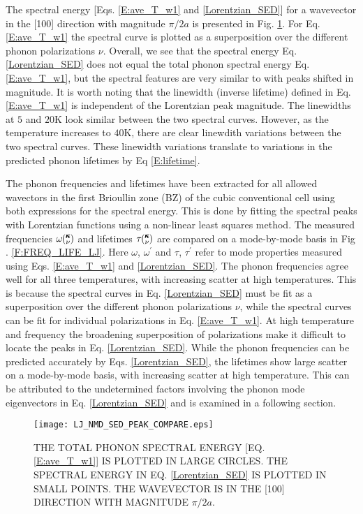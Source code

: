\documentclass[twocolumn,10pt]{asme2e}
\newcommand{\kv}{\mspace{-4.0mu}\left(\mspace{-8.0mu}\begin{smallmatrix}&\pmb{\kappa} \\&\nu\end{smallmatrix}\mspace{-3.0mu}\right)}
\begin{document}
The spectral energy [Eqs$.$ \eqref{E:ave_T_w1} and \eqref{Lorentzian_SED}] for a wavevector in the [100] direction with magnitude $\pi/2a$ is presented in Fig$.$ \ref{F:PEAK_COMPARE}. For Eq$.$ \eqref{E:ave_T_w1} the spectral curve is plotted as a superposition over the different phonon polarizations $\nu$.  Overall, we see that the spectral energy Eq$.$ \eqref{Lorentzian_SED} does not equal the total phonon spectral energy Eq$.$ \eqref{E:ave_T_w1}, but the spectral features are very similar to with peaks shifted in magnitude. It is worth noting that the linewidth (inverse lifetime) defined in Eq$.$ \eqref{E:ave_T_w1} is independent of the Lorentzian peak magnitude. The linewidths at $5$ and $20$K look similar between the two spectral curves. However, as the temperature increases to $40$K, there are clear linewdith variations between the two spectral curves. These linewidth variations translate to variations in the predicted phonon lifetimes by Eq \eqref{E:lifetime}.

The phonon frequencies and lifetimes have been extracted for all allowed wavectors in the first Brioullin zone (BZ) of the cubic conventional cell using both expressions for the spectral energy. This is done by fitting the spectral peaks with Lorentzian functions using a non-linear least squares method. The measured frequencies $\omega\kv$ and lifetimes $\tau\kv$ are compared on a mode-by-mode basis in Fig$.$ \ref{F:FREQ_LIFE_LJ}. Here $\omega$, $\omega^{'}$ and $\tau$, $\tau^{'}$  refer to mode properties measured using Eqs$.$ \eqref{E:ave_T_w1} and \eqref{Lorentzian_SED}. The phonon frequencies agree well for all three temperatures, with increasing scatter at high temperatures.  This is because the spectral curves in Eq$.$ \eqref{Lorentzian_SED} must be fit as a superposition over the different phonon polarizations $\nu$, while the spectral curves can be fit for individual polarizations in Eq$.$ \eqref{E:ave_T_w1}. At high temperature and frequency the broadening superposition of polarizations make it difficult to locate the peaks in Eq$.$ \eqref{Lorentzian_SED}. While the phonon frequencies can be predicted accurately by Eqs$.$ \eqref{Lorentzian_SED}, the lifetimes show large scatter on a mode-by-mode basis, with increasing scatter at high temperature.  This can be attributed to the undetermined factors involving the phonon mode eigenvectors in Eq$.$ \eqref{Lorentzian_SED} and is examined in a following section.

\begin{figure}
\begin{center}
\texttt{[image: LJ\_NMD\_SED\_PEAK\_COMPARE.eps]}
\end{center}
\caption{\label{F:PEAK_COMPARE} THE TOTAL PHONON SPECTRAL ENERGY [EQ$.$ \eqref{E:ave_T_w1}] IS PLOTTED IN LARGE CIRCLES.  THE SPECTRAL ENERGY IN EQ$.$ \eqref{Lorentzian_SED} IS PLOTTED IN SMALL POINTS. THE WAVEVECTOR IS IN THE [100] DIRECTION WITH MAGNITUDE $\pi/2a$.}
\vspace*{-5mm}
\end{figure}
\end{document}
